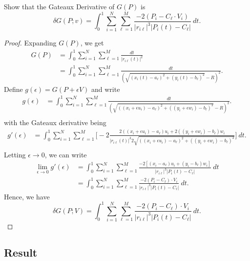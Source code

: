 \begin{prop}
    Show that the Gateaux Derivative of \( G(P) \) is 
    \[  \delta G(P;v) = \int_{ 0 }^{ 1 } \sum_{ i=1 }^{ N } \sum_{ \ell = 1  }^{ M  } \frac{ -2 (P_{i} - C_{\ell} \cdot V_{i} ) }{ | r_{i \ell} |^{3} | P_{i}(t) - C_{\ell} |  }  \ dt. \]
\end{prop}
\begin{proof}
Expanding \( G(P) \), we get
\begin{align*} 
    G(P) &= \int_{0}^{1} \sum_{i=1}^{N}\sum_{\ell=1}^{M} \frac{dt}{|r_{i\ell}(t)|^2}  \\
         &= \int_{0}^{1} \sum_{i=1}^{N}\sum_{\ell=1}^{M} \frac{dt}{(\sqrt{(x_i(t) - a_{\ell})^2 + (y_i(t) - b_{\ell})^2} - R)^2}.
\end{align*}
Define \( g(\epsilon ) = G(P + \epsilon  V)  \) and write
\begin{align*}
    g(\epsilon ) &= \int_{0}^{1} \sum_{i=1}^{N}\sum_{\ell=1}^{M} \frac{dt}{(\sqrt{((x_i + \epsilon  u_i)- a_{\ell})^2 + ((y_i + \epsilon  w_i) - b_{\ell})^2} - R)^2}. \\
\end{align*}
with the Gateaux derivative being
\begin{align*}
    g'(\epsilon ) &= \int_{0}^{1}\sum_{i=1}^{N}\sum_{\ell=1}^{M} \Bigg[ -2\frac{ 2((x_i + \epsilon  u_i) - a_{\ell})u_i + 2((y_i + \epsilon  w_i) - b_{\ell})w_i}{|r_{i\ell}(t)|^3 2\sqrt{((x_i + \epsilon  u_i)- a_{\ell})^2 + ((y_i + \epsilon  w_i) - b_{\ell})^2}}  \Bigg] \ dt. \\ 
\end{align*}
Letting \( \epsilon \to 0  \), we can write
\begin{align*}
    \lim_{ \epsilon  \to 0 }  g'(\epsilon )&= \int_{ 0 }^{ 1 }  \sum_{ i=1 }^{ N } \sum_{ \ell = 1  }^{ M  } \frac{ -2[(x_{i} - a_{\ell})u_{i} + (y_{i} - b_{\ell})w_{i}] }{ | r_{i\ell} |^{3} | P_{i}(t) - C_{\ell} |  }  \ dt \\
                                           &= \int_{ 0 }^{ 1 }  \sum_{ i=1 }^{ N } \sum_{ \ell = 1  }^{ M  } \frac{ -2 (P_{i} - C_{\ell})\cdot V_{i}  }{  | r_{i \ell} | ^{3} | P_{i}(t) - C_{\ell} |  }  \ dt.
\end{align*}
Hence, we have
\[  \delta G(P;V) = \int_{ 0 }^{ 1 }  \sum_{ i=1 }^{ N } \sum_{ \ell = 1  }^{ M  } \frac{ -2 (P_{i} - C_{\ell}) \cdot V_{i}  }{  | r_{i\ell} |^{3} | P_{i}(t) - C_{\ell} |  }  \ dt. \]
\end{proof}

\subsection{Result}

